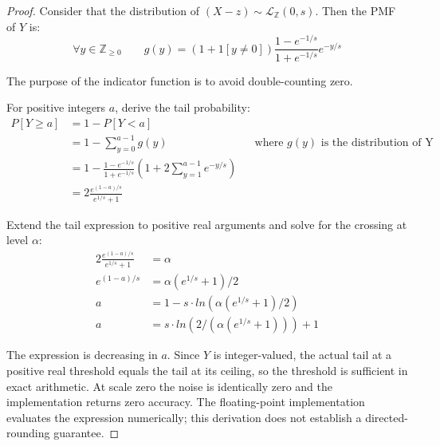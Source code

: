 \documentclass{article}
\begin{document}
\begin{proof}

Consider that the distribution of $(X - z) \sim \mathcal{L}_\mathbb{Z}(0, s)$.
Then the PMF of $Y$ is:
\begin{equation}
    \forall y \in \mathbb{Z}_{\ge 0} \qquad g(y) = (1 + 1[y \ne 0]) \frac{1 - e^{-1/s}}{1 + e^{-1/s}} e^{-y/s}
\end{equation}

The purpose of the indicator function is to avoid double-counting zero.

For positive integers $a$, derive the tail probability:
\begin{align*}
    P[Y \ge a] &= 1 - P[Y < a] \\
    &= 1 - \sum_{y=0}^{a - 1} g(y) && \text{where $g(y)$ is the distribution of Y} \\
    &= 1 - \frac{1 - e^{-1/s}}{1 + e^{-1/s}} \left(1 + 2\sum_{y=1}^{a - 1} e^{-y/s}\right) \\
    &= 2 \frac{e^{(1 - a)/s}}{e^{1/s} + 1}
\end{align*}

Extend the tail expression to positive real arguments and solve for the crossing at level $\alpha$:
\begin{align*}
    2 \frac{e^{(1 - a)/s}}{e^{1/s} + 1} &= \alpha \\
    e^{(1 - a)/s} &= \alpha (e^{1/s} + 1) / 2 \\
    a &= 1 - s \cdot ln(\alpha (e^{1/s} + 1) / 2) \\
    a &= s \cdot ln(2 / (\alpha (e^{1/s} + 1))) + 1
\end{align*}

The expression is decreasing in $a$. Since $Y$ is integer-valued, the actual tail at a positive real threshold equals the tail at its ceiling, so the threshold is sufficient in exact arithmetic.
At scale zero the noise is identically zero and the implementation returns zero accuracy.
The floating-point implementation evaluates the expression numerically; this derivation does not establish a directed-rounding guarantee.
\end{proof}
\end{document}
